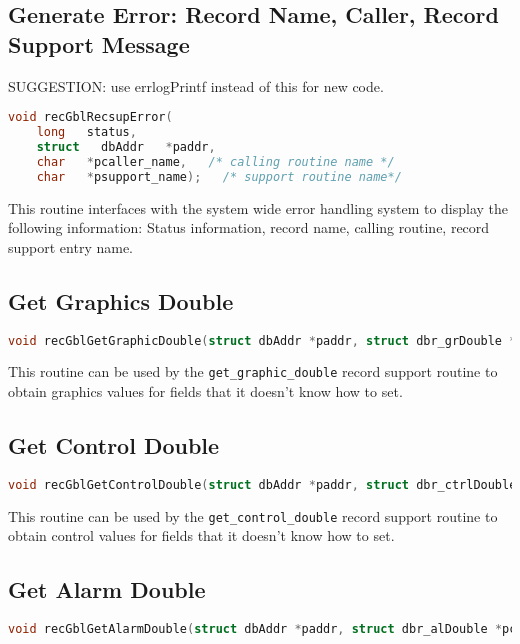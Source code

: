 \subsection{Generate Error: Record Name, Caller, Record Support Message}
SUGGESTION: use errlogPrintf instead of this for new code.
\begin{lstlisting}[language=C]
void recGblRecsupError(
    long   status,
    struct   dbAddr   *paddr,
    char   *pcaller_name,   /* calling routine name */
    char   *psupport_name);   /* support routine name*/
\end{lstlisting}

This routine interfaces with the system wide error handling system to display the following information:
Status information, record name, calling routine, record support entry name.

\subsection{Get Graphics Double}

\begin{lstlisting}[language=C]
void recGblGetGraphicDouble(struct dbAddr *paddr, struct dbr_grDouble *pgd);
\end{lstlisting}

This routine can be used by the \verb|get_graphic_double| record support routine to obtain graphics values for fields that it doesn't know how to set.

\subsection{Get Control Double}

\begin{lstlisting}[language=C]
void recGblGetControlDouble(struct dbAddr *paddr, struct dbr_ctrlDouble *pcd);
\end{lstlisting}

This routine can be used by the \verb|get_control_double| record support routine to obtain control values for fields that it doesn't know how to set.

\subsection{Get Alarm Double}

\begin{lstlisting}[language=C]
void recGblGetAlarmDouble(struct dbAddr *paddr, struct dbr_alDouble *pcd);
\end{lstlisting}

